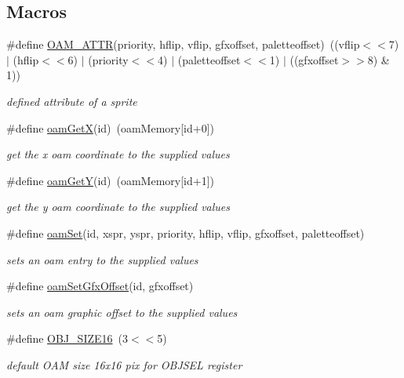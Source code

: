 \subsection*{Macros}
\begin{DoxyCompactItemize}
\item 
\#define \hyperlink{a00350_a3e2d51ca1a0ddadfbb339450c70f4f2f}{O\+A\+M\+\_\+\+A\+T\+TR}(priority,  hflip,  vflip,  gfxoffset,  paletteoffset)~((vflip$<$$<$7) $\vert$ (hflip$<$$<$6) $\vert$ (priority$<$$<$4) $\vert$ (paletteoffset$<$$<$1) $\vert$ ((gfxoffset$>$$>$8) \& 1))
\begin{DoxyCompactList}\small\item\em defined attribute of a sprite \end{DoxyCompactList}\item 
\#define \hyperlink{a00350_aefa2b9ce227904e69830a6ad981b1f19}{oam\+GetX}(id)~(oam\+Memory\mbox{[}id+0\mbox{]})
\begin{DoxyCompactList}\small\item\em get the x oam coordinate to the supplied values \end{DoxyCompactList}\item 
\#define \hyperlink{a00350_af6b605303fc7a5caa3b97fd254b5d450}{oam\+GetY}(id)~(oam\+Memory\mbox{[}id+1\mbox{]})
\begin{DoxyCompactList}\small\item\em get the y oam coordinate to the supplied values \end{DoxyCompactList}\item 
\#define \hyperlink{a00350_a2f62a591672b786d90ebb03fdf25f159}{oam\+Set}(id,  xspr,  yspr,  priority,  hflip,  vflip,  gfxoffset,  paletteoffset)
\begin{DoxyCompactList}\small\item\em sets an oam entry to the supplied values \end{DoxyCompactList}\item 
\#define \hyperlink{a00350_abec859fb490fe23b87fc34b75d8ce804}{oam\+Set\+Gfx\+Offset}(id,  gfxoffset)
\begin{DoxyCompactList}\small\item\em sets an oam graphic offset to the supplied values \end{DoxyCompactList}\item 
\mbox{\label{a00350_a35664c2c4a66c3bac8139ae093d7f3ac}} 
\#define \hyperlink{a00350_a35664c2c4a66c3bac8139ae093d7f3ac}{O\+B\+J\+\_\+\+S\+I\+Z\+E16}~(3$<$$<$5)
\begin{DoxyCompactList}\small\item\em default O\+AM size 16x16 pix for O\+B\+J\+S\+EL register \end{DoxyCompactList}\item 

\end{DoxyCompactItemize}
